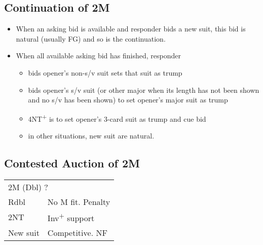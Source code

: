 \documentclass{article}
\renewcommand{\sp}{\ensuremath\spadesuit}
\newcommand{\he}{\ensuremath\heartsuit}
\newcommand{\di}{\ensuremath\diamondsuit}
\newcommand{\nt}{\relsize{-1}NT\relsize{1}}
\newcommand{\up}{\textsuperscript{+}}
\newcommand{\down}{\textsuperscript{-}}
\begin{document}
\medskip


\subsection{Continuation of 2M}

\begin{itemize}
	\item When an asking bid is available and responder bids a new suit, this bid is natural (usually FG) and so is the continuation. 
    \item When all available asking bid has finished, responder
    \begin{itemize}
    	\item bids opener's non-s/v suit sets that suit as trump
			\item bids opener's s/v suit (or other major when its length has not been shown and no s/v has been shown) to set opener's major suit as trump
			\item 4\nt\up{} is to set opener's 3-card suit as trump and cue bid 
			\item in other situations, new suit are natural.
    \end{itemize}
\end{itemize}

\subsection{Contested Auction of 2M}

\begin{tabular}{|l|p{6.5cm}}
	\multicolumn{2}{l}{2M{} (Dbl) ?}\\
	Rdbl & No M fit. Penalty \\
	2\nt{} & Inv\up{} support \\
	New suit & Competitive. NF
\end{tabular}
\end{document}
